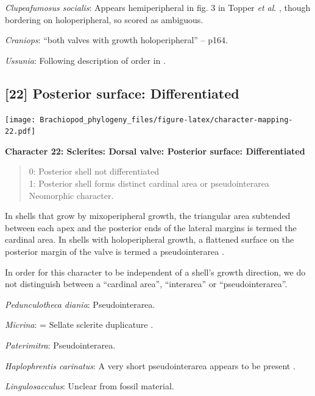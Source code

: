 \documentclass[]{book}
\theoremstyle{definition}
\theoremstyle{definition}
\theoremstyle{definition}
\theoremstyle{remark}
\begin{document}
\emph{Clupeafumosus socialis}: Appears hemiperipheral in fig. 3 in
Topper \emph{et al}. \citeyearpar{Topper2013Reappraisalof}, though
bordering on holoperipheral, so scored as ambiguous.

\emph{Craniops}: ``both valves with growth holoperipheral'' --
\citet{Williams2000BrachiopodaLinguliformea} p164.

\emph{Ussunia}: Following description of order in
\citet{Williams2000BrachiopodaLinguliformea}.

\hypertarget{posterior-surface-differentiated}{%
\subsection*{{[}22{]} Posterior surface:
Differentiated}\label{posterior-surface-differentiated}}

\texttt{[image: Brachiopod\_phylogeny\_files/figure-latex/character-mapping-22.pdf]}

\textbf{Character 22: Sclerites: Dorsal valve: Posterior surface:
Differentiated}

\begin{quote}
0: Posterior shell not differentiated\\
1: Posterior shell forms distinct cardinal area or pseudointerarea\\
Neomorphic character.
\end{quote}

In shells that grow by mixoperipheral growth, the triangular area
subtended between each apex and the posterior ends of the lateral
margins is termed the cardinal area. In shells with holoperipheral
growth, a flattened surface on the posterior margin of the valve is
termed a pseudointerarea
\citep[paraphrasing][]{Williams1997BrachiopodaRevised}.

In order for this character to be independent of a shell's growth
direction, we do not distinguish between a ``cardinal area'',
``interarea'' or ``pseudointerarea''.

\emph{Pedunculotheca diania}: Pseudointerarea.

\emph{Micrina}: = Sellate sclerite duplicature
\citep{Holmer2008TheEarly}.

\emph{Paterimitra}: Pseudointerarea.

\emph{Haplophrentis carinatus}: A very short pseudointerarea appears to
be present \citep{Moysiuk2017Hyolithsare}.

\emph{Lingulosacculus}: Unclear from fossil material.
\end{document}
